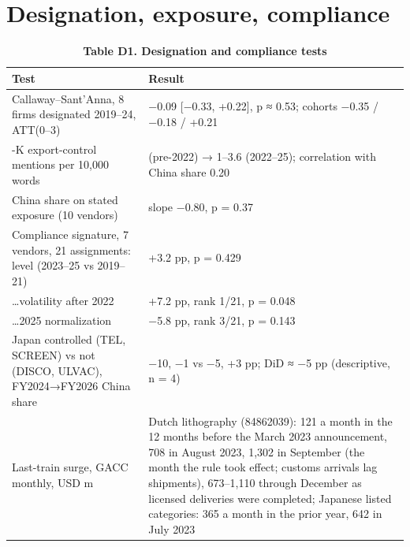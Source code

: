 \documentclass[12pt]{article}
\begin{document}
\FloatBarrier{}
\section{Designation, exposure, compliance}


\begin{table}[htbp]\centering\footnotesize{}\caption*{\textbf{Table D1. Designation and compliance tests}}\begin{tabular}{@{}
  >{\raggedright\arraybackslash}p{}
  >{\raggedright\arraybackslash}p{}@{}}
\toprule
\begin{minipage}[b]{\linewidth}\raggedright
Test
\end{minipage} & \begin{minipage}[b]{\linewidth}\raggedright
Result
\end{minipage} \\
\midrule
Callaway--Sant'Anna, 8 firms designated 2019--24, ATT(0--3) & −0.09 {[}−0.33, +0.22{]}, p ≈ 0.53; cohorts −0.35 / −0.18 / +0.21 \\
\hdashline
10-K export-control mentions per 10,000 words & 0 (pre-2022) → 1--3.6 (2022--25); correlation with China share 0.20 \\
\hdashline
China share on stated exposure (10 vendors) & slope −0.80, p = 0.37 \\
\hdashline
Compliance signature, 7 vendors, 21 assignments: level (2023--25 vs 2019--21) & +3.2 pp, p = 0.429 \\
\hdashline
\ldots volatility after 2022 & +7.2 pp, rank 1/21, p = 0.048 \\
\hdashline
\ldots2025 normalization & −5.8 pp, rank 3/21, p = 0.143 \\
\hdashline
Japan controlled (TEL, SCREEN) vs not (DISCO, ULVAC), FY2024→FY2026 China share & −10, −1 vs −5, +3 pp; DiD ≈ −5 pp (descriptive, n = 4) \\
\hdashline
Last-train surge, GACC monthly, USD m & Dutch lithography (84862039): 121 a month in the 12 months before the March 2023 announcement, 708 in August 2023, 1,302 in September (the month the rule took effect; customs arrivals lag shipments), 673--1,110 through December as licensed deliveries were completed; Japanese listed categories: 365 a month in the prior year, 642 in July 2023 \\
\bottomrule
\end{tabular}\end{table}
\end{document}
